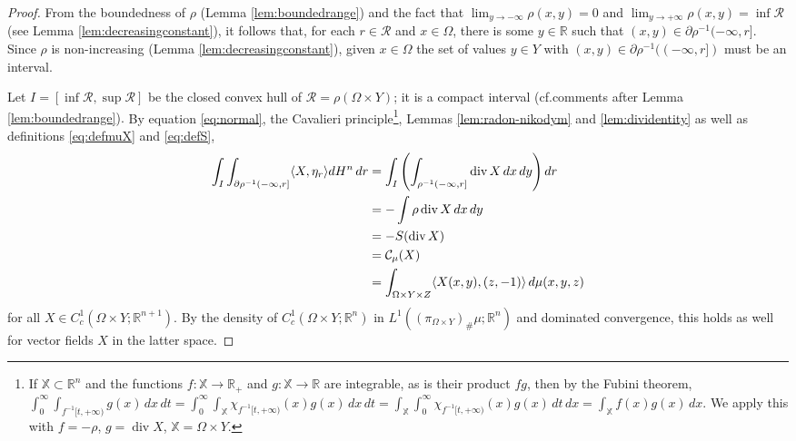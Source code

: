 \documentclass{article}
\newcommand{\R}{\mathbb{R}}
\theoremstyle{definition}
\theoremstyle{remark}
\newcommand{\proj}{\pi}
\newcommand{\projXY}{\proj_{\Omega\times Y}}
\begin{document}
 \begin{proof}
 From the boundedness of $\rho$ (Lemma \ref{lem:boundedrange}) and the fact that $\lim_{y\to-\infty}\rho(x,y)=0$ and $\lim_{y\to+\infty}\rho(x,y)=\inf {\mathcal R}$ (see Lemma \ref{lem:decreasingconstant}), it follows that, for each $r\in {\mathcal R}$ and $x\in \Omega$, there is some $y\in\R$ such that $(x,y)\in \partial\rho^{-1}(-\infty,r]$. %
 Since $\rho$ is non-increasing (Lemma \ref{lem:decreasingconstant}), given $x\in\Omega$ the set of values $y\in Y$ with $(x,y)\in \partial\rho^{-1}((-\infty,r])$ must be an interval.
 
 
%

 {Let $I=[\inf\mathcal R,\sup\mathcal R]$ be the closed convex hull of $\mathcal R=\rho(\Omega\times Y)$; it is a compact interval (cf.comments after Lemma \ref{lem:boundedrange}).}
 By equation \eqref{eq:normal}, {the Cavalieri principle}\footnote{\label{fn:cavalieri}{If $\mathbb X\subset \R^n$ and the functions $f\colon \mathbb X\to \R_+$ and $g\colon \mathbb X\to \R$ are integrable, as is their product $fg$, then by the Fubini theorem, $\int_0^\infty\int_{f^{-1}[t,+\infty)}g(x)\,dx\,dt
 =\int_0^\infty\int_{\mathbb X}\chi_{f^{-1}[t,+\infty)}(x)g(x)\,dx\,dt
 =\int_{\mathbb X}\int_0^\infty\chi_{f^{-1}[t,+\infty)}(x)g(x)\,dt\,dx
 =\int_{\mathbb X}f(x)g(x)\,dx$. We apply this with $f=-\rho$, $g=\operatorname{div}X$, $\mathbb X=\Omega\times Y$.}}, Lemmas \ref{lem:radon-nikodym} and \ref{lem:dividentity} as well as definitions \eqref{eq:defmuX} and \eqref{eq:defS},
 \begin{align}
  \notag \int_{I}\int_{\partial \rho^{-1}(-\infty,r]} \langle X,\eta_r\rangle d H^n\,dr
  \notag &=\int_{I}\left(\int_{\rho^{-1}(-\infty,r]} \operatorname{div}X\,dx\,dy\right)dr \\
  \notag &=-\int\rho\operatorname{div}X\,dx\,dy\\
  \notag &=-S(\operatorname{div} X)\\
  \notag &={\mathcal C_\mu}(X)\\
  &=\int_{\Omega\times Y\times Z} \langle X(x,y),(z,-1)\rangle\,d\mu(x,y,z)
  \label{eq:normalid}
 \end{align}
 for all $X\in C^1_c(\Omega\times Y;\R^{n+1})$. By the density 
 of $C^1_c(\Omega\times Y;\R^n)$ in $L^1((\projXY)_\#\mu;\R^n)$ \cite[Th.~8.14]{folland1999real} and dominated convergence, this holds as well for vector fields $X$ in the latter space.
 

\end{proof}
\end{document}
